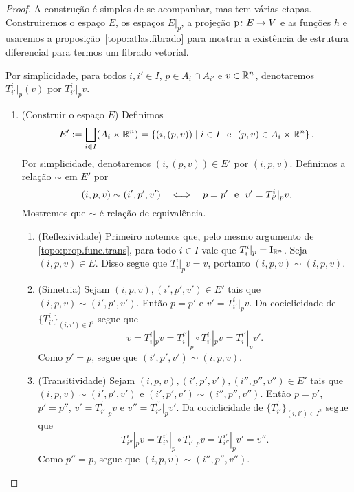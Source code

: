 \begin{proof}
A construção é simples de se acompanhar, mas tem várias etapas. Construiremos o espaço $E$, os espaços $E|_p$, a projeção $\mathrm{p}\colon E \to V$ e as funções $h$ e usaremos a proposição~\ref{topo:atlas.fibrado} para mostrar a existência de estrutura diferencial para termos um fibrado vetorial.

Por simplicidade, para todos $i,i' \in I$, $p \in A_i \cap A_{i'}$ e $v \in \mathbb{R}^n$, denotaremos $T^i_{i'}|_p (v)$ por $T^i_{i'}|_p v$.
\begin{enumerate}
\item (Construir o espaço $E$) Definimos
	\begin{equation*}
	E' := \bigsqcup_{i \in I} (A_i \times \mathbb{R}^n) = \left\{{(i,(p,v))}\;\middle\vert\;{i \in I \text{\ \ e\ \ } (p,v) \in A_i \times \mathbb{R}^n}\right\}.
	\end{equation*}
Por simplicidade, denotaremos $(i,(p,v)) \in E'$ por $(i,p,v)$. Definimos a relação $\sim$ em $E'$ por
	\begin{equation*}
	(i,p,v) \sim (i',p',v') \quad \Longleftrightarrow \quad p=p' \text{\ \ e\ \ } v'=T^i_{i'}|_p v.
	\end{equation*}
Mostremos que $\sim$ é relação de equivalência.
	
	\begin{enumerate}
	\item (Reflexividade) Primeiro notemos que, pelo mesmo argumento de \ref{topo:prop.func.trans}, para todo $i \in I$ vale que $T^i_i|_p = \mathrm{I}_{\mathbb{R}^n}$. Seja $(i,p,v) \in E$. %
Disso segue que $T^i_i|_p v = v$, portanto $(i,p,v) \sim (i,p,v)$.
	
	\item (Simetria) Sejam $(i,p,v), (i',p',v') \in E'$ tais que $(i,p,v) \sim (i',p',v')$. Então $p=p'$ e $v'=T^i_{i'}|_p v$. Da %
cociclicidade de $\{T^i_{i'}\}_{(i,i') \in I^2}$ segue que
	\begin{equation*}
	v = T^i_i|_p v = T^{i'}_i|_p \circ T^i_{i'}|_p v = T^{i'}_i|_p v'.
	\end{equation*}
Como $p'=p$, segue que $(i',p',v') \sim (i,p,v)$.
	
	\item (Transitividade) Sejam $(i,p,v), (i',p',v'), (i'',p'',v'') \in E'$ tais que $(i,p,v) \sim (i',p',v')$ e $(i',p',v') \sim (i'',p'',v'')$. Então $p=p'$, $p'=p''$, $v'=T^i_{i'}|_p v$ e $v''=T^{i'}_{i''}|_p v'$. Da cociclicidade de $\{T^i_{i'}\}_{(i,i') \in I^2}$ segue que
	\begin{equation*}
	T^i_{i''}|_p v = T^{i'}_{i''}|_p \circ T^i_{i'}|_p v = T^{i'}_{i''}|_p v' = v''.
	\end{equation*}
Como $p''=p$, segue que $(i,p,v) \sim (i'',p'',v'')$.
	\end{enumerate}


\end{enumerate}
\end{proof}
